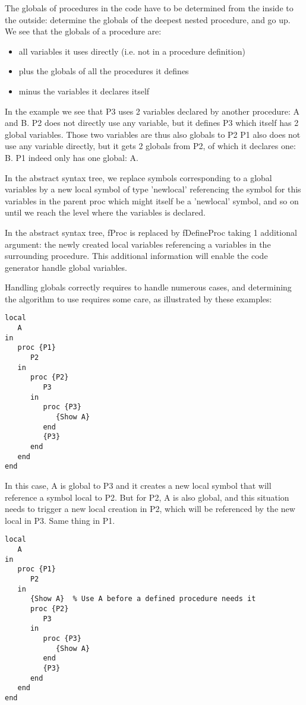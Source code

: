 \documentclass[a4paper]{memoir}
\begin{document}
The globals of procedures in the code have to be determined from the inside to the outside: determine the globals of the deepest nested procedure, and go up. 
We see that the globals of a procedure are:
\begin{itemize}
  \item all variables it uses directly (i.e. not in a procedure definition)
  \item plus the globals of all the procedures it defines
  \item minus the variables it declares itself
\end{itemize}

In the example we see that P3 uses 2 variables declared by another procedure: A and B. 
P2 does not directly use any variable, but it defines P3 which itself has 2 global variables. Those two variables are thus also globals to P2
P1 also does not use any variable directly, but it gets 2 globals from P2, of which it declares one: B. P1 indeed only has one global: A.

In the abstract syntax tree, we replace symbols corresponding to a global variables by a new local symbol of type 'newlocal' referencing the symbol for this variables in the parent proc which might itself be a 'newlocal' symbol, and so on until we reach the level where the variables is declared.

In the abstract syntax tree, fProc is replaced by fDefineProc taking 1 additional argument: the newly created local variables referencing a variables in the surrounding procedure. This additional information will enable the code generator handle global variables.

Handling globals correctly requires to handle numerous cases, and determining the algorithm to use requires some care, as illustrated by these examples:

\begin{lstlisting}
local
   A
in
   proc {P1}
      P2
   in
      proc {P2}
         P3
      in
         proc {P3}
            {Show A}
         end
         {P3}
      end
   end
end
\end{lstlisting}
In this case, A is global to P3 and it creates a new local symbol that will reference a symbol local to P2. But for P2, A is also global, and this situation needs to trigger a new local creation in P2, which will be referenced by the new local in P3. Same thing in P1.

\begin{lstlisting}
local
   A
in
   proc {P1}
      P2
   in
      {Show A}  % Use A before a defined procedure needs it
      proc {P2}
         P3
      in
         proc {P3}
            {Show A}
         end
         {P3}
      end
   end
end
\end{lstlisting}
\end{document}
